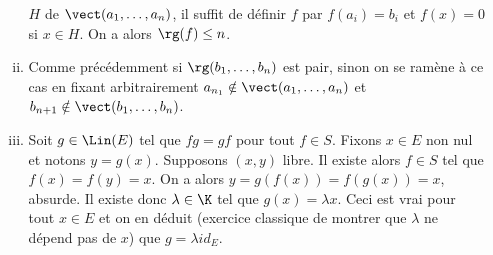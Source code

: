 \begin{enonce}
\begin{solution}
\begin{enumerate}[\bfseries a)]
\begin{enumerate}[(i)]
      $H$ de $\vect(a_1,\ldots,a_n)$, il suffit de définir $f$ par
      $f(a_i)=b_i$ et $f(x)=0$ si $x\in H$. On a alors $\rg(f)\le n$.
    \item Comme précédemment si $\rg(b_1,\ldots,b_n)$ est pair, sinon
      on se ramène à ce cas en fixant arbitrairement
      $a_{n_1}\notin\vect(a_1,\ldots,a_n)$ et
      $b_{n+1}\notin\vect(b_1,\ldots,b_n)$.
    \item Soit $g\in\Lin(E)$ tel que $fg=gf$ pour tout $f\in
      S$. Fixons $x\in E$ non nul et notons $y=g(x)$. Supposons
      $(x,y)$ libre. Il existe alors $f\in S$ tel que
      $f(x)=f(y)=x$. On a alors $y=g(f(x))=f(g(x))=x$, absurde. Il
      existe donc $\lambda\in\K$ tel que $g(x)=\lambda x$. Ceci est
      vrai pour tout $x\in E$ et on en déduit (exercice classique de
      montrer que $\lambda$ ne dépend pas de $x$) que $g=\lambda id_E$.
    \end{enumerate}
  \end{enumerate}
\end{solution}
\end{enonce}